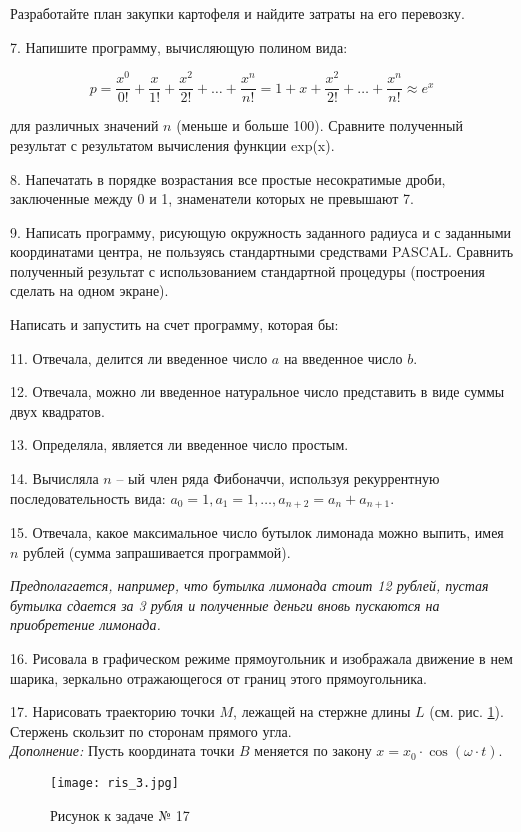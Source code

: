 Разработайте план закупки картофеля и найдите затраты на его перевозку.

7. Напишите программу, вычисляющую полином вида:

$$ p = \frac{x^0}{0!}+\frac{x}{1!}+\frac{x^2}{2!}+ \ldots + \frac{x^n}{n!} = 1 + x + \frac{x^2}{2!} + \ldots + \frac{x^n}{n!}  \approx e^x$$


для различных значений $n$ (меньше и больше 100). Сравните полученный результат с результатом вычисления функции exp(x).


8. Напечатать в порядке возрастания все простые несократимые дроби, заключенные между 0 и 1, знаменатели которых не превышают 7.
    
9. Написать программу, рисующую окружность заданного радиуса и с заданными координатами центра, не пользуясь стандартными средствами PASCAL. Сравнить полученный результат с использованием стандартной процедуры (построения сделать на одном экране).

Написать и запустить на счет программу, которая бы:

11. Отвечала, делится ли введенное число $a$ на введенное число $b$.

12. Отвечала, можно ли введенное натуральное число предста­вить в виде суммы двух квадратов.

13. Определяла, является ли введенное число простым.

14. Вычисляла $n$ -- ый член ряда Фибоначчи, используя рекур­рентную последовательность вида: 
$a_0 = 1, a_1 = 1, \ldots ,a_{n+2} = a_n + a_{n+1}.$

    15. Отвечала, какое максимальное число бутылок лимонада можно выпить, имея $n$ рублей (сумма запрашивается программой).
    
{\it Предполагается, например, что бутылка лимонада стоит 12 рублей, пустая бутылка сдается за 3 рубля и полученные деньги вновь пускаются на приобретение лимонада.}

16.	Рисовала в графическом режиме прямоугольник и изображала движение в нем шарика, зеркально отражающегося от границ этого прямоугольника.

17. Нарисовать траекторию точки $M$, лежащей на стержне длины $L$ (см. рис. \ref{ris4}). Стержень скользит по сторонам прямого угла. \\
{\it Дополнение:} Пусть координата точки $B$  меняется по закону 
$x = x_0\cdot\cos(\omega\cdot t).$
   
\begin{figure}[!hb]
\centerline{
\texttt{[image: ris\_3.jpg]}}
\caption{Рисунок к задаче № 17}
\label{ris4}
\end{figure}
 

